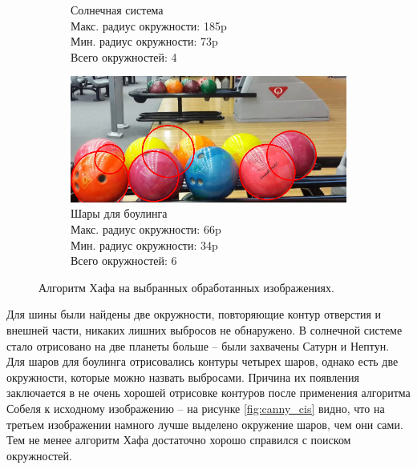 \documentclass[a4paper, 16pt]{article}
\begin{document}
\begin{figure}[htbp]
\begin{subfigure}{0.3\textwidth}
            \caption{Солнечная система\\Макс. радиус окружности: 185p\\Мин. радиус окружности: 73p\\Всего окружностей: 4}
            \label{fig:canny_hc_ci2}
        \end{subfigure}
        \hfill
        \begin{subfigure}{0.3\textwidth}
            \centering
            \includegraphics[width=\linewidth]{canny_hc_ci3.png}
            \caption{Шары для боулинга\\Макс. радиус окружности: 66p\\Мин. радиус окружности: 34p\\Всего окружностей: 6}
            \label{fig:canny_hc_ci3}
        \end{subfigure}
        \caption{Алгоритм Хафа на выбранных обработанных изображениях.}
        \label{fig:canny_hc_cis}
    \end{figure}


    \noindent Для шины были найдены две окружности, повторяющие контур отверстия и внешней части, никаких лишних выбросов не обнаружено.
    В солнечной системе стало отрисовано на две планеты больше -- были захвачены Сатурн и Нептун. Для шаров для боулинга отрисовались контуры
    четырех шаров, однако есть две окружности, которые можно назвать выбросами. Причина их появления заключается в не очень хорошей отрисовке контуров
    после применения алгоритма Собеля к исходному изображению -- на рисунке \ref{fig:canny_cis} видно, что на третьем изображении намного лучше выделено
    окружение шаров, чем они сами. Тем не менее алгоритм Хафа достаточно хорошо справился с поиском окружностей.
\end{document}
